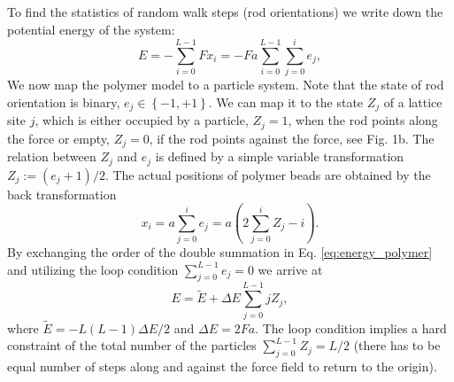 \documentclass[aps,showpacs,twocolumn,floatfix,prx,superscriptaddress]{revtex4-1}
\begin{document}
To find the statistics of random walk steps (rod orientations) we write down the potential energy of the system:
\begin{equation}
    \label{eq:energy_polymer}
    E  = -\sum_{i=0}^{L-1} {Fx_i} = -Fa\sum_{i=0}^{L-1} \sum_{j=0}^{i}e_j, 
\end{equation}
We now map the polymer model to a particle system. Note that the state of rod
orientation is binary, $e_j \in \left\{-1, +1\right\}$. We can map it to the state $Z_j$ of a
lattice site $j$, which is either occupied by a particle, $Z_j = 1$, when the rod points along the force
or empty, $Z_j = 0$, if the rod points against the force, see Fig. 1b. The relation between $Z_j$ and $e_j$ is defined by a simple
variable transformation $Z_j := \left(e_j+1\right)/2$. The actual positions of polymer
beads are obtained by the back transformation
\begin{equation}
    \label{eq:z2x}
    x_i = a \sum_{j=0}^{i}{e_j} = a\left(2\sum_{j=0}^{i}{Z_j} -i\right).
\end{equation}
By exchanging the order of the double summation in Eq.
\eqref{eq:energy_polymer} and utilizing the loop condition  $\sum_{j=0}^{L-1} e_j = 0$ we 
arrive at 
\begin{equation}
    \label{eq:energy_particle}
    E = \tilde{E} + \Delta E \sum_{j=0}^{L-1} j Z_j, 
\end{equation}
where $\tilde{E}= - L(L-1) \Delta E /2$ and $\Delta E = 2Fa$. The loop condition
implies a hard constraint of the total number of the particles
$\sum_{j=0}^{L-1} Z_j = L/2$ (there has to be equal number of steps along and against the force field to return to the origin).
\end{document}
